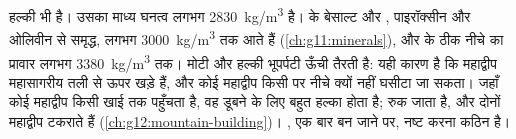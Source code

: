  हल्की भी है। उसका माध्य घनत्व लगभग
\qty{2830}{kg/m^3} है।  के बेसाल्ट और ,
पाइरॉक्सीन और ओलिवीन से समृद्ध, लगभग \qty{3000}{kg/m^3} तक आते हैं
(\cref{ch:g11:minerals}), और  के ठीक नीचे का प्रावार लगभग
\qty{3380}{kg/m^3} तक। मोटी और हल्की भूपर्पटी ऊँची तैरती है: यही कारण है कि
महाद्वीप महासागरीय तली से ऊपर खड़े हैं, और कोई महाद्वीप किसी  पर नीचे क्यों नहीं घसीटा जा सकता। जहाँ कोई महाद्वीप किसी खाई तक पहुँचता है, वह डूबने के लिए
बहुत हल्का होता है;  रुक जाता है, और दोनों महाद्वीप टकराते हैं
(\cref{ch:g12:mountain-building})। , एक बार बन जाने पर, नष्ट करना
कठिन है।

